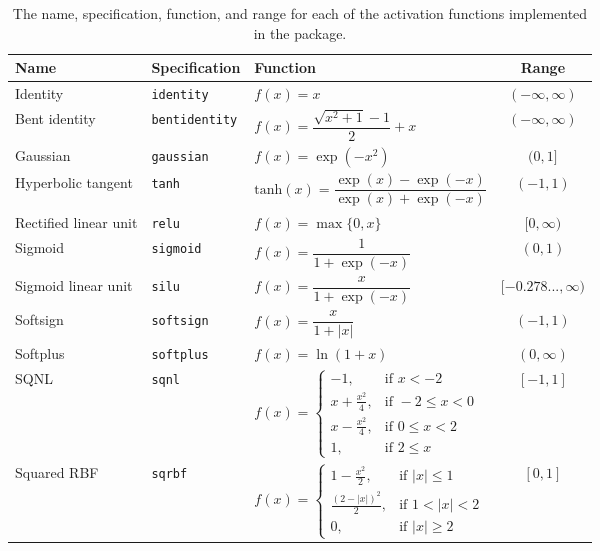 \documentclass[
]{jss}
\begin{document}
\begin{table}[ht!]
\caption{\label{tab:activation}The name, specification, function, and range for each of the activation functions implemented in the  package.}
\centering
\begin{tabular}{lllc}
\toprule
\textbf{Name} & \textbf{Specification} & \textbf{Function} & \textbf{Range} \\ 
\midrule
Identity & \texttt{identity} & $f(x) = x$ & $(-\infty, \infty)$ \\[5pt]
Bent identity & \texttt{bentidentity} & $f(x) = \dfrac{\sqrt{x^2 + 1} - 1}{2} + x$ & $(-\infty, \infty)$ \\[10pt]
Gaussian & \texttt{gaussian} & $f(x) = \exp(-x^2)$ & $(0, 1]$ \\[7pt]
Hyperbolic tangent & \texttt{tanh} & $\text{tanh}(x) = \dfrac{\exp(x) - \exp(-x)}{\exp(x) + \exp(-x)}$ & $(-1, 1)$ \\[10pt]
Rectified linear unit & \texttt{relu} & $f(x) = \max\{0, x\}$ & $[0, \infty)$ \\[5pt]
Sigmoid & \texttt{sigmoid} & $f(x) = \dfrac{1}{1 + \exp(-x)}$ & $(0, 1)$ \\[10pt]
Sigmoid linear unit & \texttt{silu} & $f(x) = \dfrac{x}{1 + \exp(-x)}$ & $[-0.278..., \infty)$ \\[10pt]
Softsign & \texttt{softsign} & $f(x) = \dfrac{x}{1 + |x|}$ & $(-1, 1)$ \\[10pt]
Softplus & \texttt{softplus} & $f(x) = \ln(1 + x)$ & $(0, \infty)$ \\[5pt] 
SQNL & \texttt{sqnl} & $f(x) = \left\{\begin{array}{ll} -1, & \text{if } x < -2 \\[3pt] x + \frac{x^2}{4}, & \text{if } -2 \leq x < 0 \\[3pt] x - \frac{x^2}{4}, & \text{if } 0 \leq x < 2 \\[3pt] 1, & \text{if } 2 \leq x \end{array} \right.$ & $[-1, 1]$ \\[15pt] 
Squared RBF & \texttt{sqrbf} & $f(x) = \left\{\begin{array}{ll} 1 - \frac{x^2}{2}, & \text{if } |x| \leq 1 \\[3pt] \frac{(2 - |x|)^2}{2}, & \text{if } 1 < |x| < 2 \\[3pt] 0, & \text{if } |x| \geq 2 \end{array} \right.$ & $[0, 1]$ \\[5pt]
\bottomrule
\end{tabular}
\end{table}
\end{document}
